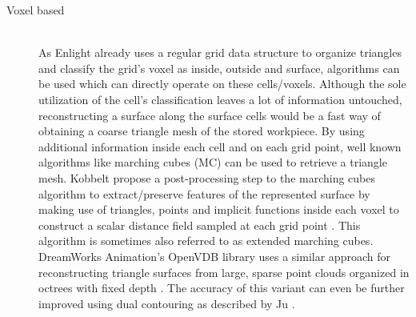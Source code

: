 \begin{description}
	
	\item[Voxel based] \hfill \\
	As Enlight already uses a regular grid data structure to organize triangles and classify the grid's voxel as inside, outside and surface, algorithms can be used which can directly operate on these cells/voxels.
	Although the sole utilization of the cell's classification leaves a lot of information untouched, reconstructing a surface along the surface cells would be a fast way of obtaining a coarse triangle mesh of the stored workpiece.
	By using additional information inside each cell and on each grid point, well known algorithms like marching cubes (MC) can be used to retrieve a triangle mesh.
	Kobbelt \etal propose a post-processing step to the marching cubes algorithm to extract/preserve features of the represented surface by making use of triangles, points and implicit functions inside each voxel to construct a scalar distance field sampled at each grid point \cite{extended_marching_cubes}.
	This algorithm is sometimes also referred to as extended marching cubes.
	DreamWorks Animation's OpenVDB library uses a similar approach for reconstructing triangle surfaces from large, sparse point clouds organized in octrees with fixed depth \cite{openvdb}.
	The accuracy of this variant can even be further improved using dual contouring as described by Ju \etal \cite{dual_contouring}.

\end{description}

